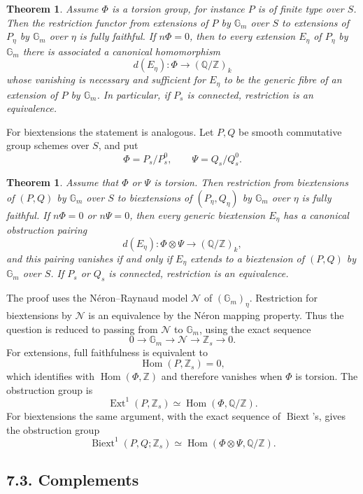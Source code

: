 \documentclass[11pt]{article}
\newtheorem{theorem}[proposition]{Theorem}
\newcommand{\bZ}{\mathbb Z}
\newcommand{\bQ}{\mathbb Q}
\newcommand{\Gm}{\mathbb G_m}
\newcommand{\Ext}{\operatorname{Ext}}
\newcommand{\Hom}{\operatorname{Hom}}
\newcommand{\Biext}{\operatorname{Biext}}
\begin{document}
\begin{theorem}
Assume \(\Phi\) is a torsion group, for instance \(P\) is of finite type over
\(S\). Then the restriction functor from extensions of \(P\) by \(\Gm\) over
\(S\) to extensions of \(P_\eta\) by \(\Gm\) over \(\eta\) is fully faithful.
If \(n\Phi=0\), then to every extension \(E_\eta\) of \(P_\eta\) by
\(\Gm\) there is associated a canonical homomorphism
\[
d(E_\eta):\Phi\longrightarrow (\bQ/\bZ)_k
\]
whose vanishing is necessary and sufficient for \(E_\eta\) to be the generic
fibre of an extension of \(P\) by \(\Gm\). In particular, if \(P_s\) is
connected, restriction is an equivalence.
\end{theorem}

For biextensions the statement is analogous. Let \(P,Q\) be smooth commutative
group schemes over \(S\), and put
\[
\Phi=P_s/P_s^0,\qquad \Psi=Q_s/Q_s^0.
\]

\begin{theorem}
Assume that \(\Phi\) or \(\Psi\) is torsion. Then restriction from biextensions
of \((P,Q)\) by \(\Gm\) over \(S\) to biextensions of
\((P_\eta,Q_\eta)\) by \(\Gm\) over \(\eta\) is fully faithful. If \(n\Phi=0\)
or \(n\Psi=0\), then every generic biextension \(E_\eta\) has a canonical
obstruction pairing
\[
d(E_\eta):\Phi\otimes\Psi\longrightarrow (\bQ/\bZ)_k,
\]
and this pairing vanishes if and only if \(E_\eta\) extends to a biextension of
\((P,Q)\) by \(\Gm\) over \(S\). If \(P_s\) or \(Q_s\) is connected, restriction
is an equivalence.
\end{theorem}

The proof uses the Néron--Raynaud model \(\mathcal N\) of \((\Gm)_\eta\).
Restriction for biextensions by \(\mathcal N\) is an equivalence by the Néron
mapping property. Thus the question is reduced to passing from
\(\mathcal N\) to \(\Gm\), using the exact sequence
\[
0\longrightarrow \Gm\longrightarrow \mathcal N\longrightarrow \bZ_s
\longrightarrow 0.
\]
For extensions, full faithfulness is equivalent to
\[
\Hom(P,\bZ_s)=0,
\]
which identifies with \(\Hom(\Phi,\bZ)\) and therefore vanishes when \(\Phi\) is
torsion. The obstruction group is
\[
\Ext^1(P,\bZ_s)\simeq \Hom(\Phi,\bQ/\bZ).
\]
For biextensions the same argument, with the exact sequence of \(\Biext\)'s,
gives the obstruction group
\[
\Biext^1(P,Q;\bZ_s)\simeq
\Hom(\Phi\otimes\Psi,\bQ/\bZ).
\]

\subsection*{7.3. Complements}
\end{document}
